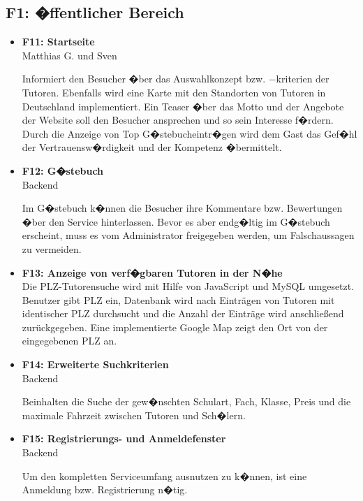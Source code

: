 \documentclass[10pt,a4paper]{scrartcl}
\begin{document}
\subsection{F1: �ffentlicher Bereich}
\begin{itemize}
\item[] \textbf{F11: Startseite} \\

Matthias G. und Sven

Informiert den Besucher �ber das Auswahlkonzept bzw. $-$kriterien der Tutoren. Ebenfalls wird eine Karte mit den Standorten von Tutoren in Deutschland implementiert. Ein Teaser �ber das Motto und der Angebote der Website soll den Besucher ansprechen und so sein Interesse f�rdern. Durch die Anzeige von Top G�stebucheintr�gen wird dem Gast das Gef�hl der Vertrauensw�rdigkeit und der Kompetenz �bermittelt. 

\item[] \textbf{F12: G�stebuch}\\

Backend

Im G�stebuch k�nnen die Besucher ihre Kommentare bzw. Bewertungen �ber den Service hinterlassen. Bevor es aber endg�ltig im G�stebuch erscheint, muss es vom Administrator freigegeben werden, um Falschaussagen zu vermeiden. 

\item[] \textbf{F13: Anzeige von verf�gbaren Tutoren in der N�he}\\

Die PLZ-Tutorensuche wird mit Hilfe von JavaScript und MySQL umgesetzt.
Benutzer gibt PLZ ein, Datenbank wird nach Einträgen von Tutoren mit identischer PLZ durchsucht und die Anzahl der Einträge wird anschließend zurückgegeben.
Eine implementierte Google Map zeigt den Ort von der eingegebenen PLZ an.

\item[] \textbf{F14: Erweiterte Suchkriterien}\\

Backend

Beinhalten die Suche der gew�nschten Schulart, Fach, Klasse, Preis und die maximale Fahrzeit zwischen Tutoren und Sch�lern. 

\item[] \textbf{F15: Registrierungs- und Anmeldefenster}\\

Backend

Um den kompletten Serviceumfang ausnutzen zu k�nnen, ist eine Anmeldung bzw. Registrierung n�tig.


\end{itemize}
\end{document}
